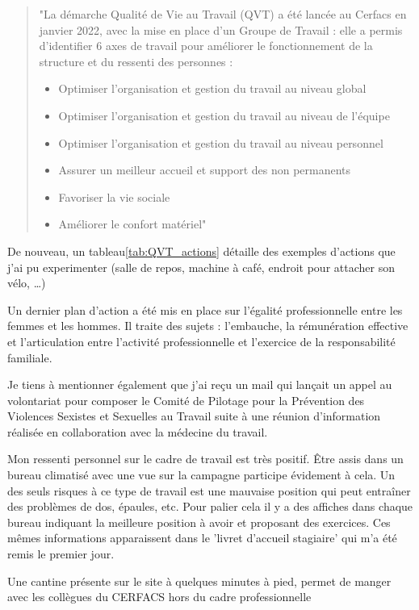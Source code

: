     \begin{quote}
        \setlength{\leftmargin}{0.5cm} %
        \setlength{\rightmargin}{0.5cm} %
        "La démarche Qualité de Vie au Travail (QVT) a été lancée au Cerfacs en janvier 2022, avec la mise en
        place d’un Groupe de Travail : elle a permis d’identifier 6 axes de travail pour améliorer le
        fonctionnement de la structure et du ressenti des personnes :
        \begin{itemize}
            \item Optimiser l’organisation et gestion du travail au niveau global
            \item Optimiser l’organisation et gestion du travail au niveau de l’équipe
            \item Optimiser l’organisation et gestion du travail au niveau personnel
            \item Assurer un meilleur accueil et support des non permanents
            \item Favoriser la vie sociale
            \item Améliorer le confort matériel"
        \end{itemize}
    \end{quote}

    De nouveau, un tableau\ref{tab:QVT_actions} détaille des exemples d'actions que j'ai pu experimenter (salle de repos, machine à café, endroit pour attacher son vélo, \dots)

    Un dernier plan d'action a été mis en place sur l'égalité professionnelle entre les femmes et les hommes. Il traite des sujets : l’embauche, la rémunération effective et l’articulation entre l’activité professionnelle et l’exercice de la responsabilité familiale.

    Je tiens à mentionner également que j'ai reçu un mail qui lançait un appel au volontariat pour composer le Comité de Pilotage pour la Prévention des Violences Sexistes et Sexuelles au Travail suite à une réunion d'information réalisée en collaboration avec la médecine du travail.

\vspace{1cm}


Mon ressenti personnel sur le cadre de travail est très positif. Être assis dans un bureau climatisé avec une vue sur la campagne participe évidement à cela. Un des seuls risques à ce type de travail est une mauvaise position qui peut entraîner des problèmes de dos, épaules, etc. Pour palier cela il y a des affiches dans chaque bureau indiquant la meilleure position à avoir et proposant des exercices. Ces mêmes informations apparaissent dans le 'livret d'accueil stagiaire' qui m'a été remis le premier jour.

Une cantine présente sur le site à quelques minutes à pied, permet de manger avec les collègues du CERFACS hors du cadre professionnelle